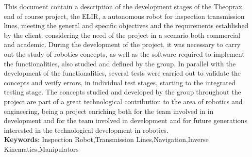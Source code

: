 \begin{thesisabastract}
 This document contain a description of the development stages of the Theoprax end of course project, the ELIR, a autonomous robot for inspection transmission lines, meeting the general and specific objectives and the requirements established by the client, considering the need of the project in a scenario both commercial and academic. During the development of the project, it was necessary to carry out the study of robotics concepts, as well as the software required to implement the functionalities, also studied and defined by the group. In parallel with the development of the functionalities, several tests were carried out to validate the concepts and verify errors, in individual test stages, starting to the integrated testing stage. 
The concepts studied and developed by the group throughout the project are part of a great technological contribution to the area of robotics and engineering, being a project enriching both for the team involved in in development and for the team involved in development and for future generations interested in the technological development in robotics.
\ \\

\textbf{Keywords}: Inspection Robot,Transmission Lines,Navigation,Inverse Kinematics,Manipulators

\end{thesisabastract}
